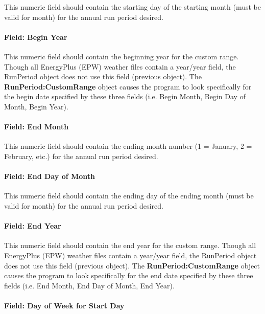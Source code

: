 This numeric field should contain the starting day of the starting month (must be valid for month) for the annual run period desired.

\paragraph{Field: Begin Year}\label{field-begin-year}

This numeric field should contain the beginning year for the custom range. Though all EnergyPlus (EPW) weather files contain a year/year field, the RunPeriod object does not use this field (previous object). The \textbf{RunPeriod:CustomRange} object causes the program to look specifically for the begin date specified by these three fields (i.e. Begin Month, Begin Day of Month, Begin Year).

\paragraph{Field: End Month}\label{field-end-month-2}

This numeric field should contain the ending month number (1 = January, 2 = February, etc.) for the annual run period desired.

\paragraph{Field: End Day of Month}\label{field-end-day-of-month-2}

This numeric field should contain the ending day of the ending month (must be valid for month) for the annual run period desired.

\paragraph{Field: End Year}\label{field-end-year}

This numeric field should contain the end year for the custom range. Though all EnergyPlus (EPW) weather files contain a year/year field, the RunPeriod object does not use this field (previous object). The \textbf{RunPeriod:CustomRange} object causes the program to look specifically for the end date specified by these three fields (i.e. End Month, End Day of Month, End Year).

\paragraph{Field: Day of Week for Start Day}\label{field-day-of-week-for-start-day-3}

